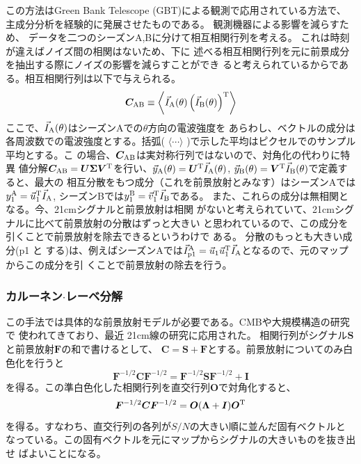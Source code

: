 この方法はGreen Bank Telescope (GBT)による観測で応用されている方法で、
主成分分析を経験的に発展させたものである\citep{2013MNRAS.434L..46S}。
観測機器による影響を減らすため、
データを二つのシーズンA,Bに分けて相互相関行列を考える。
これは時刻が違えばノイズ間の相関はないため、下に
述べる相互相関行列を元に前景成分を抽出する際にノイズの影響を減らすことができ
ると考えられているからである。相互相関行列は以下で与えられる。
\begin{equation}
 \bm{C}_{\rm AB} \equiv \left<
\vec{I}_{\rm A}(\theta)\left(\vec{I}_{\rm B}(\theta)\right)^{\rm T}
\right>
\end{equation}
ここで、$\vec{I}_{\rm A}(\theta)$はシーズンAでの$\theta$方向の電波強度を
あらわし、ベクトルの成分は各周波数での電波強度とする。括弧(
$\langle\cdots\rangle$ )で示した平均はピクセルでのサンプル平均とする。こ
の場合、$ \bm{C}_{\rm AB}$は実対称行列ではないので、対角化の代わりに特異
値分解$\bm{C}_{\rm AB} = \bm{U\Sigma V}^{\rm T}$を行い、$\vec{y}_{\rm
A}(\theta) = \bm{U}^{\rm T} \vec{I}_{\rm A}(\theta)$, $\vec{y}_{\rm
B}(\theta) = \bm{V}^{\rm T} \vec{I}_{\rm B}(\theta)$で定義すると、最大の
相互分散をもつ成分（これを前景放射とみなす）はシーズンAでは$y_{1}^{\rm
A}=\vec{u}_1^{\rm T} \vec{I}_{\rm A}$, シーズンBでは$y_{1}^{\rm
B}=\vec{v}_1^{\rm T} \vec{I}_{\rm B}$である。
また、これらの成分は無相関となる。今、21cmシグナルと前景放射は相関
がないと考えられていて、21cmシグナルに比べて前景放射の分散はずっと大きい
と思われているので、この成分を引くことで前景放射を除去できるというわけで
ある。
分散のもっとも大きい成分(p1
と する)は、例えばシーズンAでは$\vec{I}_{\rm p1}^{\rm A} = \vec{u}_1
\vec{u}_1^{\rm T} \vec{I}_{\rm A}$となるので、元のマップからこの成分を引
くことで前景放射の除去を行う。

\subsubsection{カルーネン$\cdot$レーベ分解}

この手法では具体的な前景放射モデルが必要である。CMBや大規模構造の研究で
使われてきており\citep{1995PhRvL..74.4369B,1996ApJ...465...34V}、最近
21cm線の研究に応用された\citep{2014ApJ...781...57S}。
相関行列がシグナル$\bm{S}$と前景放射$\bm{F}$の和で書けるとして、
$\bm{C}=\bm{S}+\bm{F} $とする。前景放射についてのみ白色化を行うと
\begin{equation}
\bm{F}^{-1/2} \bm{C} \bm{F}^{-1/2} = 
\bm{F}^{-1/2} \bm{S} \bm{F}^{-1/2} + \bm{I}
\end{equation}
を得る。この準白色化した相関行列を直交行列$\bm{O}$で対角化すると、
\begin{equation}
 \bm{F}^{-1/2} \bm{C} \bm{F}^{-1/2} = \bm{O}
(\bm{\Lambda}+\bm{I})\bm{O}^{\rm T}
\end{equation}
を得る。すなわち、直交行列の各列が$S/N$の大きい順に並んだ固有ベクトルと
なっている。この固有ベクトルを元にマップからシグナルの大きいものを抜き出せ
ばよいことになる。

